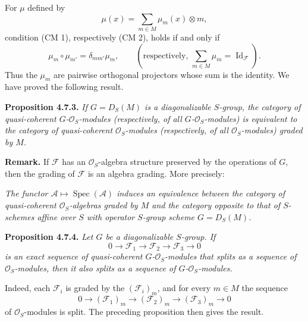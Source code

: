 For \(\mu\) defined by
\[
  \mu(x)=\sum_{m\in M}\mu_m(x)\otimes m,
\]
condition (CM 1), respectively (CM 2), holds if and only if
\[
  \mu_m\circ\mu_{m'}=\delta_{mm'}\mu_m,
  \qquad
  \left(\text{respectively, }\sum_{m\in M}\mu_m
    =\operatorname{Id}_{\mathscr F}\right).
\]
Thus the \(\mu_m\) are pairwise orthogonal projectors whose sum is the
identity. We have proved the following result.

\medskip
\noindent{}\textbf{Proposition 4.7.3.}
\textit{If \(G=D_S(M)\) is a diagonalizable \(S\)-group, the category
of quasi-coherent \(G\)-\(\mathcal O_S\)-modules (respectively, of all
\(G\)-\(\mathcal O_S\)-modules) is equivalent to the category of
quasi-coherent \(\mathcal O_S\)-modules (respectively, of all
\(\mathcal O_S\)-modules) graded by \(M\).}

\medskip
\noindent\textbf{Remark.}
If \(\mathscr F\) has an \(\mathcal O_S\)-algebra structure preserved
by the operations of \(G\), then the grading of \(\mathscr F\) is an
algebra grading. More precisely:

\medskip
\noindent{}\textit{The functor
\(\mathscr A\mapsto\operatorname{Spec}(\mathscr A)\) induces an
equivalence between the category of quasi-coherent
\(\mathcal O_S\)-algebras graded by \(M\) and the category opposite to
that of \(S\)-schemes affine over \(S\) with operator \(S\)-group scheme
\(G=D_S(M)\).}

\medskip
\noindent{}\textbf{Proposition 4.7.4.}
\textit{Let \(G\) be a diagonalizable \(S\)-group. If
\[
  0\longrightarrow\mathscr F_1\longrightarrow\mathscr F_2
    \longrightarrow\mathscr F_3\longrightarrow0
\]
is an exact sequence of quasi-coherent \(G\)-\(\mathcal O_S\)-modules
that splits as a sequence of \(\mathcal O_S\)-modules, then it also
splits as a sequence of \(G\)-\(\mathcal O_S\)-modules.}

Indeed, each \(\mathscr F_i\) is graded by the
\((\mathscr F_i)_m\), and for every \(m\in M\) the sequence
\[
  0\longrightarrow(\mathscr F_1)_m\longrightarrow(\mathscr F_2)_m
    \longrightarrow(\mathscr F_3)_m\longrightarrow0
\]
of \(\mathcal O_S\)-modules is split. The preceding proposition then
gives the result.

